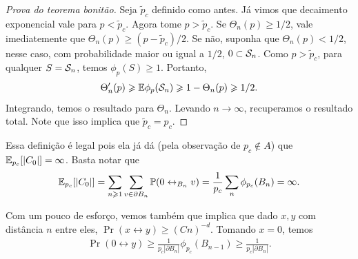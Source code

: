 \begin{proof}[Prova do teorema bonitão]
	Seja $\tilde{p}_c$ definido como antes. Já vimos que decaimento
	exponencial vale para $p < \tilde{p}_c$.
	Agora tome $p > \tilde{p}_c$. Se $\Theta_n(p) \geq 1/2$, vale imediatemente
	que $\Theta_n(p) \geq (p - \tilde{p}_c)/2$. Se não, suponha que
	$\Theta_n(p) < 1/2$, nesse caso,
	com probabilidade maior ou igual a $1/2$, $0 \subset \mathcal{S}_n$. Como $p
	> \tilde{p}_c$,
	para qualquer $S = \mathcal{S}_n$, temos $\phi_p(S) \geq 1$. Portanto,
	\[
		\Theta_n'(p) \geqslant \mathbb{E} \phi_p(\mathcal{S}_n) \geqslant 1 - \Theta_n(p) \geqslant 1/2.
	\]
	Integrando, temos o resultado para $\Theta_n$. Levando $n \to
	\infty$, recuperamos
	o resultado total. Note que isso implica que $\tilde{p}_c = p_c$.
\end{proof}

\begin{remark}
	Essa definição é legal pois ela já dá (pela observação de $p_c \not \in A$)
	que $\mathbb{E}_{p_c}[|C_0|] = \infty$. Basta notar que
	\[
		\mathbb{E}_{p_c}[|C_0|] = \sum_{n \geqslant 1} \sum_{v \in \partial B_n} \mathbb{P}(0
		\leftrightarrow_{B_n} v) = \frac{1}{p_c}\sum_{n} \phi_{p_c}(B_n) = \infty.
	\]
\end{remark}

\begin{remark}
	Com um pouco de esforço, vemos também que implica que dado $x,y$ com
	distância $n$ entre eles,
	$\Pr(x \leftrightarrow y) \geq (Cn)^{-d}$. Tomando $x = 0$, temos
	\begin{align*}
		\Pr(0 \leftrightarrow y) \geq \frac{1}{p_c |\partial
		B_n|}\phi_{p_c}(B_{n-1}) \geq \frac{1}{p_c|\partial B_{n}|}.
	\end{align*}
\end{remark}
